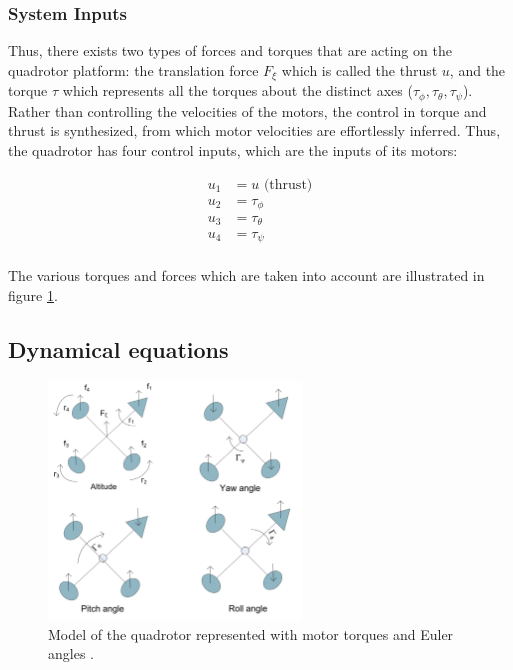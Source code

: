 \documentclass{thesisreport}
\begin{document}
\subsubsection*{System Inputs}

Thus, there exists two types of forces and torques that are acting on the quadrotor platform: the translation force $F_{\xi}$ which is called the thrust $u$, and the torque $\tau$ which represents all the torques about the distinct axes ($\tau_{\phi}, \tau_{\theta}, \tau_{\psi} $). \\

Rather than controlling the velocities of the motors, the control in torque and thrust is synthesized, from which motor velocities are effortlessly inferred. Thus, the quadrotor has four control inputs, which are the inputs of its motors:

\begin{align*}
u_1 &= u \text{ (thrust)} \\
u_2 &= \tau_{\phi}\\
u_3 &= \tau_{\theta}\\
u_4 &= \tau_{\psi}\\
\end{align*}

The various torques and forces which are taken into account are illustrated in figure \ref{Fantoni_a}.

\subsection{Dynamical equations}

\begin{figure}[h]
\centering
\includegraphics[width=0.6\textwidth]{Images/Modeling/Fantoni_a}
\caption{Model of the quadrotor represented with motor torques and Euler angles \cite{Fantoni2016}.}
\label{Fantoni_a}
\end{figure}
\end{document}
